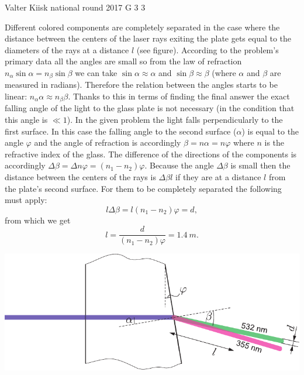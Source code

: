 \documentclass[11pt]{article}
\begin{document}
{Valter Kiisk} %
{national round} %
{2017} %
{G 3} %
{3} %
{

\ifEngSolution
Different colored components are completely separated in the case where the distance between the centers of the laser rays exiting the plate gets equal to the diameters of the rays at a distance $l$ (see figure). According to the problem’s primary data all the angles are small so from the law of refraction $n_\alpha\sin\alpha=n_\beta\sin\beta$ we can take $\sin\alpha\approx\alpha$ and $\sin\beta\approx\beta$ (where $\alpha$ and $\beta$ are measured in radians). Therefore the relation between the angles starts to be linear: $n_\alpha\alpha\approx n_\beta\beta$. Thanks to this in terms of finding the final answer the exact falling angle of the light to the glass plate is not necessary (in the condition that this angle is $\ll 1$). In the given problem the light falls perpendicularly to the first surface. In this case the falling angle to the second surface ($\alpha$) is equal to the angle $\varphi$ and the angle of refraction is accordingly $\beta=n\alpha=n\varphi$ where $n$ is the refractive index of the glass. The difference of the directions of the components is accordingly $\Delta\beta=\Delta n\varphi=(n_1-n_2)\varphi$. Because the angle $\Delta\beta$ is small then the distance between the centers of the rays is $\Delta\beta l$ if they are at a distance $l$ from the plate’s second surface. For them to be completely separated the following must apply:
\[
l\Delta\beta=l(n_1-n_2)\varphi=d,
\]
from which we get
\[
l = \frac{d}{(n_1-n_2)\varphi} = \SI{1.4}{m}.
\]
\begin{center}
	\includegraphics[width=0.93\linewidth]{2017-v3g-03-laser-lahend}
\end{center}
\fi
}
\end{document}

